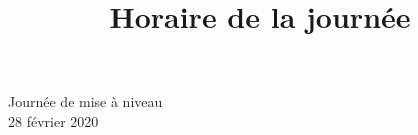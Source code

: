 \documentclass[12pt,letterpaper]{article}
\title{Horaire de la journée}
\begin{document}
\thispagestyle{empty}
\begin{minipage}{0.3\textwidth}
	\logofvdr[height=1.8cm]
\end{minipage}%
\begin{minipage}{0.7\textwidth}
	\raggedleft
Journée de mise à niveau\\
28 février 2020
\end{minipage}

\vspace{2cm}

\centering

\end{document}
